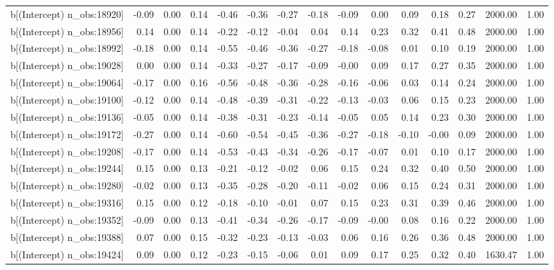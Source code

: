 \begin{table}[ht]
\begin{tabular}{rrrrrrrrrrrrrrr}
  b[(Intercept) n\_obs:18920] & -0.09 & 0.00 & 0.14 & -0.46 & -0.36 & -0.27 & -0.18 & -0.09 & 0.00 & 0.09 & 0.18 & 0.27 & 2000.00 & 1.00 \\ 
  b[(Intercept) n\_obs:18956] & 0.14 & 0.00 & 0.14 & -0.22 & -0.12 & -0.04 & 0.04 & 0.14 & 0.23 & 0.32 & 0.41 & 0.48 & 2000.00 & 1.00 \\ 
  b[(Intercept) n\_obs:18992] & -0.18 & 0.00 & 0.14 & -0.55 & -0.46 & -0.36 & -0.27 & -0.18 & -0.08 & 0.01 & 0.10 & 0.19 & 2000.00 & 1.00 \\ 
  b[(Intercept) n\_obs:19028] & 0.00 & 0.00 & 0.14 & -0.33 & -0.27 & -0.17 & -0.09 & -0.00 & 0.09 & 0.17 & 0.27 & 0.35 & 2000.00 & 1.00 \\ 
  b[(Intercept) n\_obs:19064] & -0.17 & 0.00 & 0.16 & -0.56 & -0.48 & -0.36 & -0.28 & -0.16 & -0.06 & 0.03 & 0.14 & 0.24 & 2000.00 & 1.00 \\ 
  b[(Intercept) n\_obs:19100] & -0.12 & 0.00 & 0.14 & -0.48 & -0.39 & -0.31 & -0.22 & -0.13 & -0.03 & 0.06 & 0.15 & 0.23 & 2000.00 & 1.00 \\ 
  b[(Intercept) n\_obs:19136] & -0.05 & 0.00 & 0.14 & -0.38 & -0.31 & -0.23 & -0.14 & -0.05 & 0.05 & 0.14 & 0.23 & 0.30 & 2000.00 & 1.00 \\ 
  b[(Intercept) n\_obs:19172] & -0.27 & 0.00 & 0.14 & -0.60 & -0.54 & -0.45 & -0.36 & -0.27 & -0.18 & -0.10 & -0.00 & 0.09 & 2000.00 & 1.00 \\ 
  b[(Intercept) n\_obs:19208] & -0.17 & 0.00 & 0.14 & -0.53 & -0.43 & -0.34 & -0.26 & -0.17 & -0.07 & 0.01 & 0.10 & 0.17 & 2000.00 & 1.00 \\ 
  b[(Intercept) n\_obs:19244] & 0.15 & 0.00 & 0.13 & -0.21 & -0.12 & -0.02 & 0.06 & 0.15 & 0.24 & 0.32 & 0.40 & 0.50 & 2000.00 & 1.00 \\ 
  b[(Intercept) n\_obs:19280] & -0.02 & 0.00 & 0.13 & -0.35 & -0.28 & -0.20 & -0.11 & -0.02 & 0.06 & 0.15 & 0.24 & 0.31 & 2000.00 & 1.00 \\ 
  b[(Intercept) n\_obs:19316] & 0.15 & 0.00 & 0.12 & -0.18 & -0.10 & -0.01 & 0.07 & 0.15 & 0.23 & 0.31 & 0.39 & 0.46 & 2000.00 & 1.00 \\ 
  b[(Intercept) n\_obs:19352] & -0.09 & 0.00 & 0.13 & -0.41 & -0.34 & -0.26 & -0.17 & -0.09 & -0.00 & 0.08 & 0.16 & 0.22 & 2000.00 & 1.00 \\ 
  b[(Intercept) n\_obs:19388] & 0.07 & 0.00 & 0.15 & -0.32 & -0.23 & -0.13 & -0.03 & 0.06 & 0.16 & 0.26 & 0.36 & 0.48 & 2000.00 & 1.00 \\ 
  b[(Intercept) n\_obs:19424] & 0.09 & 0.00 & 0.12 & -0.23 & -0.15 & -0.06 & 0.01 & 0.09 & 0.17 & 0.25 & 0.32 & 0.40 & 1630.47 & 1.00 \\ 

\end{tabular}
\end{table}
